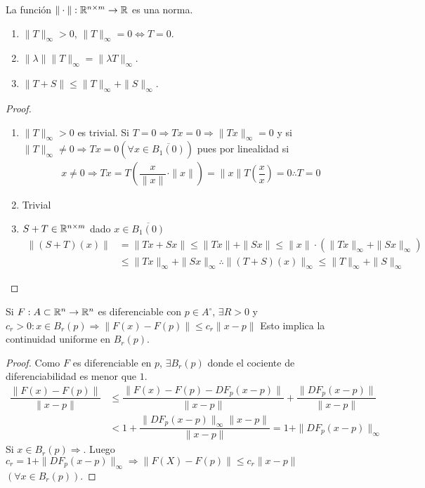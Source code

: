 \begin{lemma}
  La función \( \| \cdot \|: \mathbb{R}^{n \times m} \to \mathbb{R} \) es una norma.
  \begin{enumerate}
    \item \( \|T\|_{\infty} > 0\), \( \|T\|_{\infty} = 0 \iff T = 0\).
    \item \( \|\lambda \| \|T\|_{\infty} = \|\lambda T\|_{\infty} \).
    \item \( \| T + S\| \leq \|T\|_{\infty} + \|S\|_{\infty} \).
  \end{enumerate}
  \begin{proof}
    \begin{enumerate}
      \item \( \|T\|_{\infty} > 0\) es trivial. Si \(T = 0 \Rightarrow Tx = 0 \Rightarrow \|Tx\|_{\infty} = 0\) y si \( \|T\|_{\infty} \neq 0 \Rightarrow Tx=0 (\forall x \in \overline{B_1(0)}) \) pues por linealidad si
            \begin{align*}
              x \neq 0 \Rightarrow Tx = T(\dfrac{x}{\|x\|} \cdot \|x\|) = \|x\| T(\dfrac{x}{x}) = 0 \therefore T = 0
            \end{align*}
      \item Trivial
      \item \(S + T \in \mathbb{R}^{n \times m} \) dado \(x \in \overline{B_1(0)} \) \begin{align*}
              \|(S+T)(x)\| & = \| Tx + Sx \| \leq \|Tx\| + \|Sx\| \leq  \|x\| \cdot (\|Tx\|_{\infty} + \|Sx\|_{\infty})                   \\
                           & \leq \|Tx\|_{\infty} + \|Sx\|_{\infty} \therefore \|(T+S)(x)\|_{\infty} \leq \|T\|_{\infty} + \|S\|_{\infty}
            \end{align*}
    \end{enumerate}
  \end{proof}
\end{lemma}

\begin{lemma}
  Si \(F: A \subset \mathbb{R}^n \to \mathbb{R}^n\) es diferenciable con \(p \in A^{\circ} \), \(\exists R > 0\) y \(c_r > 0 : x \in B_r(p) \Rightarrow \| F(x) - F(p) \| \leq c_r \| x - p\| \)
  Esto implica la continuidad uniforme en \(B_r(p)\).
  \begin{proof}
    Como \(F\) es diferenciable en \(p\), \(\exists B_r(p)\) donde el cociente de diferenciabilidad es menor que \(1\).\begin{align*}
      \dfrac{\|F(x) - F(p)\|}{\|x - p \|} & \leq \dfrac{\|F(x) - F(p) - DF_p(x-p) \|}{\|x-p\|} + \dfrac{\| DF_p(x-p) \|}{\|x-p\|} \\
                                          & < 1 + \dfrac{\|DF_p(x-p)\|_{\infty} \|x-p\|}{\|x-p\|} = 1 + \|DF_p(x-p)\|_{\infty}
    \end{align*}
    Si \(x \in B_r(p) \Rightarrow \). Luego \(c_r = 1 + \|DF_p(x-p)\|_{\infty} \Rightarrow \|F(X) - F(p)\| \leq c_r \|x-p\| \) \((\forall x \in B_r(p))\).
  \end{proof}
\end{lemma}
